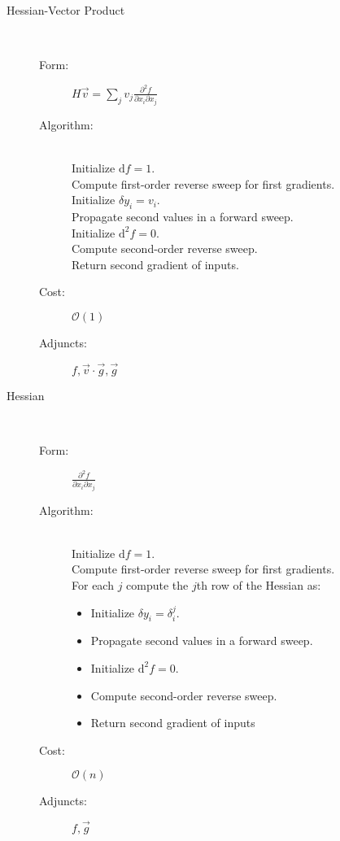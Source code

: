\begin{description}
	\item[Hessian-Vector Product] \hfill \\
	\begin{description}
		\item[Form:] $\displaystyle H \vec{v} = \sum_{j} v_{j} \frac{ \partial^{2} f }{ \partial x_{i} \partial x_{j} } $
		\item[Algorithm:] \hfill \\
		Initialize $\mathrm{d} f = 1$. \\
		Compute first-order reverse sweep for first gradients. \\
		Initialize $\delta y_{i} = v_{i}$. \\
		Propagate second values in a forward sweep. \\
		Initialize $\mathrm{d}^{2} f = 0.$ \\
		Compute second-order reverse sweep. \\
		Return second gradient of inputs.
		\item[Cost:] $\mathcal{O} \! \left( 1 \right)$
		\item[Adjuncts:] $ f, \vec{v} \cdot \vec{g}, \vec{g}$
	\end{description}
	
	\item[Hessian] \hfill \\
	\begin{description}
		\item[Form:] $\displaystyle \frac{ \partial^{2} f }{ \partial x_{i} \partial x_{j} } $
		\item[Algorithm:] \hfill \\
		Initialize $\mathrm{d} f = 1$. \\
		Compute first-order reverse sweep for first gradients. \\
		For each $j$ compute the $j$th row of the Hessian as:
		\begin{itemize}
			\setlength{\itemsep}{0cm}
			\setlength{\parskip}{0cm}
			\item[] Initialize $\delta y_{i} = \delta^{j}_{i}$.
			\item[] Propagate second values in a forward sweep. 
			\item[] Initialize $\mathrm{d}^{2} f = 0.$
			\item[] Compute second-order reverse sweep.
			\item[] Return second gradient of inputs
		\end{itemize}
		\item[Cost:] $\mathcal{O} \! \left( n \right)$
		\item[Adjuncts:] $ f, \vec{g}$
	\end{description}
	

\end{description}
